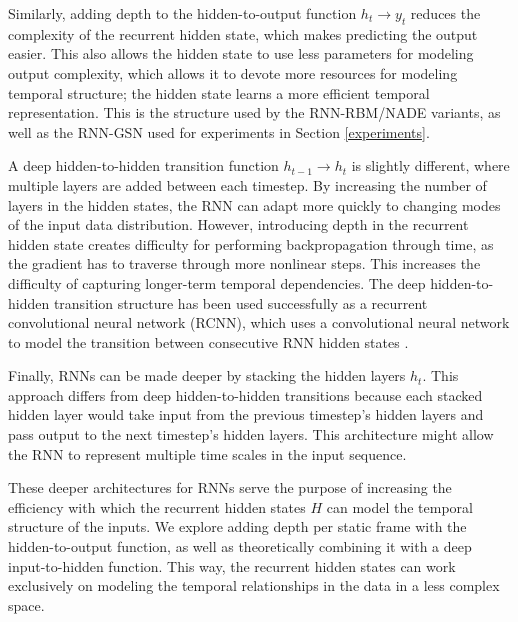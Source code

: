 Similarly, adding depth to the hidden-to-output function \(h_t \rightarrow y_t\) reduces the complexity of the recurrent hidden state, which makes predicting the output easier. This also allows the hidden state to use less parameters for modeling output complexity, which allows it to devote more resources for modeling temporal structure; the hidden state learns a more efficient temporal representation. This is the structure used by the RNN-RBM/NADE variants, as well as the RNN-GSN used for experiments in Section \ref{experiments}.

A deep hidden-to-hidden transition function \(h_{t-1} \rightarrow h_t\) is slightly different, where multiple layers are added between each timestep. By increasing the number of layers in the hidden states, the RNN can adapt more quickly to changing modes of the input data distribution. However, introducing depth in the recurrent hidden state creates difficulty for performing backpropagation through time, as the gradient has to traverse through more nonlinear steps. This increases the difficulty of capturing longer-term temporal dependencies. The deep hidden-to-hidden transition structure has been used successfully as a recurrent convolutional neural network (RCNN), which uses a convolutional neural network to model the transition between consecutive RNN hidden states \cite{rcnn}.

Finally, RNNs can be made deeper by stacking the hidden layers \(h_t\). This approach differs from deep hidden-to-hidden transitions because each stacked hidden layer would take input from the previous timestep's hidden layers and pass output to the next timestep's hidden layers. This architecture might allow the RNN to represent multiple time scales in the input sequence.

These deeper architectures for RNNs serve the purpose of increasing the efficiency with which the recurrent hidden states $H$ can model the temporal structure of the inputs. We explore adding depth per static frame with the hidden-to-output function, as well as theoretically combining it with a deep input-to-hidden function. This way, the recurrent hidden states can work exclusively on modeling the temporal relationships in the data in a less complex space.